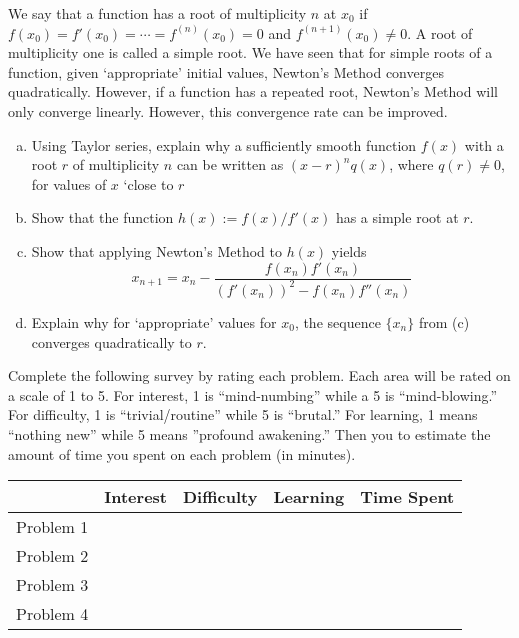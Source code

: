 \documentclass[11pt,letterpaper]{article}
\begin{document}
\newpage



 We say that a function has a root of multiplicity $n$ at $x_0$ if $f(x_0)= f'(x_0)= \cdots= f^{(n)}(x_0)= 0$ and $f^{(n+1)}(x_0) \neq 0$. A root of multiplicity one is called a simple root. We have seen that for simple roots of a function, given `appropriate' initial values, Newton's Method converges quadratically. However, if a function has a repeated root, Newton's Method will only converge linearly. However, this convergence rate can be improved.
	\begin{enumerate}[(a)]
	\item Using Taylor series, explain why a sufficiently smooth function $f(x)$ with a root $r$ of multiplicity $n$ can be written as $(x - r)^n q(x)$, where $q(r) \neq 0$, for values of $x$ `close to $r$
	\item Show that the function $h(x):= f(x)/f'(x)$ has a simple root at $r$. 
	\item Show that applying Newton's Method to $h(x)$ yields
		\[
		x_{n+1}= x_n - \dfrac{f(x_n) f'(x_n)}{(f'(x_n))^2 - f(x_n) f''(x_n)}
		\]
	\item Explain why for `appropriate' values for $x_0$, the sequence $\{ x_n \}$ from (c) converges quadratically to $r$. 
	\end{enumerate}



\newpage



 \pvspace{0.3cm}

Complete the following survey by rating each problem. Each area will be rated on a scale of 1 to 5. For interest, 1 is ``mind-numbing'' while a 5 is ``mind-blowing.'' For difficulty, 1 is ``trivial/routine'' while 5 is ``brutal.'' For learning, 1 means ``nothing new'' while 5 means ''profound awakening.'' Then you to estimate the amount of time you spent on each problem (in minutes). 

\vspace{0.25cm}
\begin{center}
\begin{tabular}{c||c|c|c|c|}
 & Interest & Difficulty & Learning & Time Spent \\ \hline \hline
Problem 1 &  &  &  &  \\ \hline
Problem 2 &  &  &  &  \\ \hline
Problem 3 &  &  &  &  \\ \hline
Problem 4 &  &  &  &  \\ \hline
\end{tabular}
\end{center}
\vspace{0.25cm}
\end{document}
